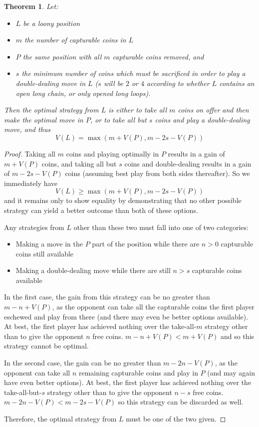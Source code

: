 \documentclass[a4paper,twocolumn]{article}
\newtheorem{loonyoptions}[thm]{Theorem}
\begin{document}
\begin{loonyoptions}\label{loonyoptions}
  Let:
  \begin{itemize}
    \item $L$ be a loony position
    \item $m$ the number of capturable coins in $L$
    \item $P$ the same position with all $m$ capturable coins removed,
      and
    \item $s$ the minimum number of coins which must be sacrificed in
      order to play a double-dealing move in $L$ ($s$ will be $2$ or
      $4$ according to whether $L$ contains an open long chain, or
      only opened long loops).
  \end{itemize}

  Then the optimal strategy from $L$ is either to take all $m$ coins
  on offer and then make the optimal move in $P$, or to take all but
  $s$ coins and play a double-dealing move, and thus
  $$V(L) = \max(m+V(P), m-2s-V(P))$$
\end{loonyoptions}

\begin{proof}
  Taking all $m$ coins and playing optimally in $P$ results in a gain
  of $m+V(P)$ coins, and taking all but $s$ coins and double-dealing
  results in a gain of $m-2s-V(P)$ coins (assuming best play from both
  sides thereafter). So we immediately have $$V(L) \ge \max(m+V(P),
  m-2s-V(P))$$ and it remains only to show equality by demonstrating
  that no other possible strategy can yield a better outcome than both
  of these options.

  Any strategies from $L$ other than these two must fall into one of
  two categories:
  \begin{itemize}
    \item Making a move in the $P$ part of the position while there
      are $n > 0$ capturable coins still available
    \item Making a double-dealing move while there are still $n > s$
      capturable coins available
  \end{itemize}

  In the first case, the gain from this strategy can be no greater
  than $m-n+V(P)$, as the opponent can take all the capturable coins
  the first player eschewed and play from there (and there may even be
  better options available). At best, the first player has achieved
  nothing over the take-all-$m$ strategy other than to give the
  opponent $n$ free coins. $m-n+V(P) < m+V(P)$ and so this strategy
  cannot be optimal.

  In the second case, the gain can be no greater than $m-2n-V(P)$, as
  the opponent can take all $n$ remaining capturable coins and play in
  $P$ (and may again have even better options). At best, the first
  player has achieved nothing over the take-all-but-$s$ strategy other
  than to give the opponent $n - s$ free coins.  $m-2n-V(P) <
  m-2s-V(P)$ so this strategy can be discarded as well.

  Therefore, the optimal strategy from $L$ must be one of the two
  given.
\end{proof}
\end{document}
